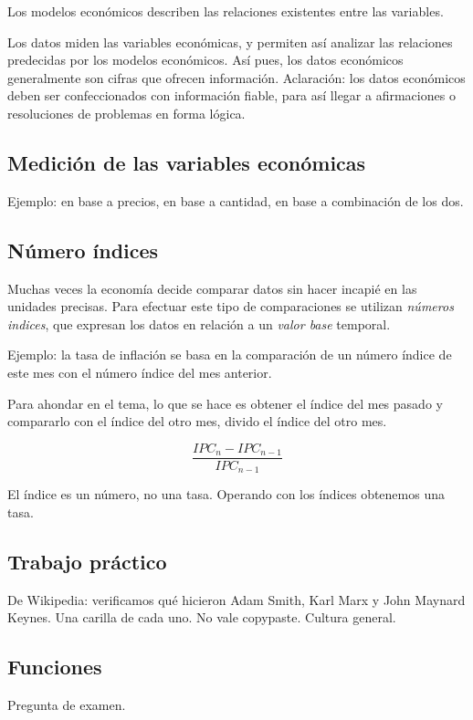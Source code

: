 Los modelos económicos describen las relaciones existentes entre las variables.

Los datos miden las variables económicas,
y permiten así analizar las relaciones predecidas por los modelos económicos.
Así pues,
los datos económicos generalmente son cifras que ofrecen información.
Aclaración: los datos económicos deben ser confeccionados con información fiable,
para así llegar a afirmaciones o resoluciones de problemas en forma lógica.

\subsection{Medición de las variables económicas}

Ejemplo: en base a precios,
en base a cantidad,
en base a combinación de los dos.

\subsection{Número índices}

Muchas veces la economía decide comparar datos sin hacer incapié en las unidades precisas.
Para efectuar este tipo de comparaciones se utilizan \textit{números indices},
que expresan los datos en relación a un \textit{valor base} temporal.

Ejemplo: la tasa de inflación se basa en la comparación de un número índice de este mes con 
el número índice del mes anterior.

Para ahondar en el tema, lo que se hace es 
obtener el índice del mes pasado y compararlo con el índice del otro mes,
divido el índice del otro mes.

\begin{equation*}
    \frac{IPC_{n} - IPC_{n-1}}{IPC_{n-1}}
\end{equation*}

El índice es un número, no una tasa.
Operando con los índices obtenemos una tasa.

\subsection{Trabajo práctico}

De Wikipedia: verificamos qué hicieron Adam Smith, Karl Marx y John Maynard Keynes.
Una carilla de cada uno. No vale copypaste. Cultura general.

\subsection{Funciones }

Pregunta de examen.